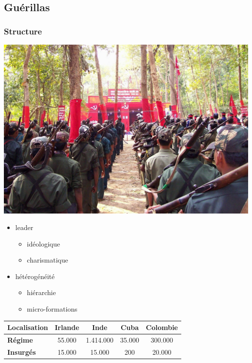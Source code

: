 \documentclass{article}
\begin{document}
\subsection{Guérillas}

\subsubsection{Structure}
\begin{centering}
		\includegraphics[width=\linewidth]{../ressources/guerrilla_naxalite}
		\end{centering}
	\begin{itemize}
			\item leader
			\begin{itemize}
				\item idéologique
				\item charismatique
			\end{itemize}
		\end{itemize}
		\begin{itemize}
			\item hétérogénéité
			\begin{itemize}
				\item hiérarchie
				\item micro-formations
			\end{itemize}
		\end{itemize}
	
\begin{tabular}{| l | c | c | c | c |}
	\hline
	\textbf{Localisation}		& \textbf{Irlande} 	& \textbf{Inde} 	& \textbf{Cuba}	& \textbf{Colombie}	\\
	\hline
	\textbf{Régime}			& 55.000			& 1.414.000	& 35.000		& 300.000			\\
	\textbf{Insurgés}		& 15.000			& 15.000		& 200		& 20.000			\\
	\hline
\end{tabular}
\cite{guerrilla_naxalite, naxalite_guerrilla_wiki, irish_civil_war_wiki}
\end{document}
